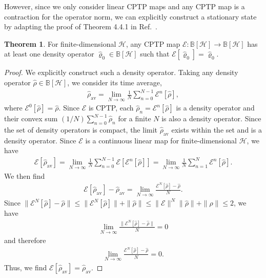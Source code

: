 \documentclass[preprint,pteplogo]{ptephy_v2}%
\numberwithin{equation}{section}
\theoremstyle{definition}
\newtheorem{theorem}{Theorem}
\newcommand{\mc}[1]{\mathcal{#1}}
\newcommand{\mbb}[1]{\mathbb{#1}}
\begin{document}
However, since we only consider linear CPTP maps and any CPTP map is a contraction for the operator norm, we can explicitly construct a stationary state by adapting the proof of Theorem 4.4.1 in Ref.~\cite{rivas2012open}.

\begin{theorem}
For finite-dimensional $\mc{H}$, any CPTP map $\mc{E}: \mbb{B}[\mc{H}] \to \mbb{B}[\mc{H}]$ has at least one density operator $\hat{\varrho}_0 \in \mbb{B}[\mc{H}]$ such that $\mc{E}[\hat{\varrho}_0] = \hat{\varrho}_0$.
\end{theorem}

\begin{proof}
We explicitly construct such a density operator.
Taking any density operator $\hat{\rho} \in \mbb{B}[\mc{H}]$, we consider its time average,
\begin{align}
\hat{\rho}_\textrm{av} = \lim_{N \to \infty} \frac{1}{N} \sum_{n=0}^{N-1} \mc{E}^n[\hat{\rho}],
\end{align}
where $\mc{E}^0[\hat{\rho}] = \hat{\rho}$.
Since $\mc{E}$ is CPTP, each $\hat{\rho}_n = \mc{E}^n[\hat{\rho}]$ is a density operator and their convex sum $(1/N) \sum_{n=0}^{N-1} \hat{\rho}_n$ for a finite $N$ is also a density operator.
Since the set of density operators is compact, the limit $\hat{\rho}_\textrm{av}$ exists within the set and is a density operator.
Since $\mc{E}$ is a continuous linear map for finite-dimensional $\mc{H}$, we have 
\begin{align}
\mc{E}[\hat{\rho}_\textrm{av}] 
= \lim_{N \to \infty} \frac{1}{N} \sum_{n=0}^{N-1}  \mc{E}[\mc{E}^n[\hat{\rho}]] 
= \lim_{N \to \infty} \frac{1}{N} \sum_{n=1}^{N} \mc{E}^{n}[\hat{\rho}].
\end{align}
We then find
\begin{align}
\mc{E}[\hat{\rho}_\textrm{av}] - \hat{\rho}_\textrm{av} = \lim_{N \to \infty} \frac{\mc{E}^N[\hat{\rho}] - \hat{\rho}}{N}.
\end{align}
Since $\| \mc{E}^N[\hat{\rho}] -\hat{\rho} \| \leq \| \mc{E}^N[\hat{\rho}] \| + \| \hat{\rho} \| \leq \| \mc{E} \|^N \| \hat{\rho} \| + \| \hat{\rho} \|  \leq 2$, we have 
\begin{align}
\lim_{N \to \infty} \frac{\| \mc{E}^N[\hat{\rho}] -\hat{\rho} \|}{N} = 0
\end{align}
and therefore
\begin{align}
\lim_{N \to \infty} \frac{\mc{E}^N[\hat{\rho}] - \hat{\rho}}{N} = 0.
\end{align}
Thus, we find $\mc{E}[\hat{\rho}_\textrm{av}] = \hat{\rho}_\textrm{av}$.
\end{proof}
\end{document}
